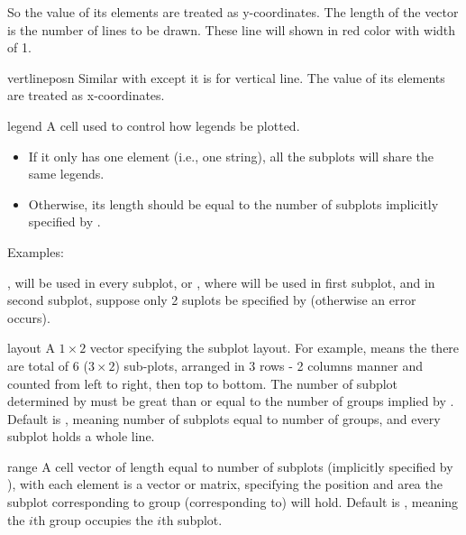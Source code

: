 \begin{argdesc}
\begin{argdesc}
                        So the value of its elements are treated as y-coordinates. 
                        The length of the vector is the number of lines to be drawn.
                        These line will shown in red color with width of 1.
      \item[vertlineposn] Similar with  except it is for vertical line. 
                        The value of its elements are treated as x-coordinates. 
      \item[legend]    A cell used to control how legends be plotted. 
                         \begin{itemize}
                         \item If it only has one element (i.e., one string), all the subplots will share the same legends.
                         \item Otherwise, its length should be equal to the number of subplots implicitly specified by .
                         \end{itemize}
                         Examples:\par
                         , will be used in every subplot,
                         or , 
                         where  will be used in first subplot, 
                         and  in second subplot, 
                         suppose only 2 suplots be specified by  (otherwise an error occurs).
                         
     \item[layout]    A $1\times2$ vector specifying the subplot layout. For example,
                      \mcode{[3,2]} means the there are total of 6 ($3\times 2$) sub-plots,
                      arranged in 3 rows - 2 columns manner 
                      and counted from left to right, then top to bottom.
                      The number of subplot determined by  must be great than or equal to
                      the number of groups implied by .
                      Default is , meaning number of subplots equal to number of groups,
                      and every subplot holds a whole line.
     \item[range]     A cell vector of length equal to number of subplots (implicitly specified by ),
                      with each element is a vector or matrix, specifying the position and area the subplot corresponding to group
                      (corresponding to) will hold. 
                      Default is , meaning the $i$th group occupies the $i$th subplot.


\end{argdesc}
\end{argdesc}
